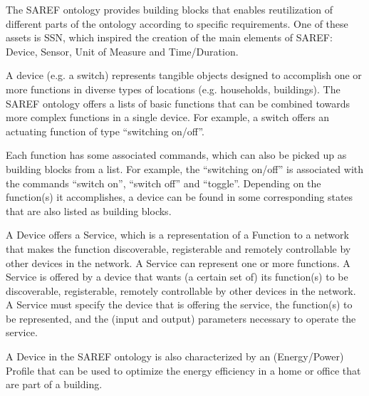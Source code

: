 \documentclass{sig-alternate-05-2015}
\begin{document}
The SAREF ontology provides building blocks that enables reutilization of different parts of the ontology according to specific requirements. One of these assets is SSN, which inspired the creation of the main elements of SAREF: Device, Sensor, Unit of Measure and Time/Duration. 

A device (e.g. a switch) represents tangible objects designed to accomplish one or more functions in diverse types of locations (e.g. households, buildings). The SAREF ontology offers a lists of basic functions that can be combined towards more complex functions in a single device. For example, a switch offers an actuating function of type “switching on/off”. 

Each function has some associated commands, which can also be picked up as building blocks from a list. For example, the “switching on/off” is associated with the commands “switch on”, “switch off” and “toggle”. Depending on the function(s) it accomplishes, a device can be found in some corresponding states that are also listed as building blocks. 

A Device offers a Service, which  is a representation of a Function to a network that makes the function discoverable, registerable and remotely controllable by other devices in the network. A Service can represent one or more functions. A Service is offered by a device that wants (a certain set of) its function(s) to be discoverable, registerable, remotely controllable by other devices in the network. A Service must specify the device that is offering the service, the function(s) to be represented, and the (input and output) parameters necessary to operate the service. 

A Device in the SAREF ontology is also characterized by an (Energy/Power) Profile that can be used to optimize the energy efficiency in a home or office that are part of a building.

\end{document}
